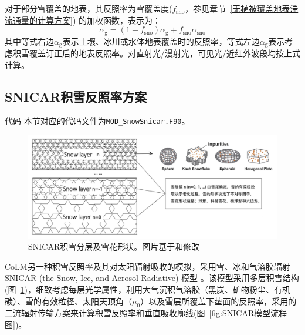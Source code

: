 对于部分雪覆盖的地表，其反照率为雪覆盖度($f_{\mathrm{sno}}$，参见章节~\ref{无植被覆盖地表湍流通量的计算方案}) 的加权函数，表示为：
\begin{equation}
  \alpha_{\mathrm{g}}=\left(1-f_{\mathrm{sno}}\right) \alpha_{\mathrm{g}} + f_{\mathrm{sno}} \alpha_{\mathrm{sno}}
\end{equation}
其中等式右边$\alpha_{\mathrm{g}}$表示土壤、冰川或水体地表覆盖时的反照率，等式左边$\alpha_{\mathrm{g}}$表示考虑积雪覆盖订正后的地表反照率。对直射光/漫射光，可见光/近红外波段均按上式计算。

\subsection{SNICAR积雪反照率方案}\label{SNICAR积雪反照率}
\begin{mymdframed}{代码}
  本节对应的代码文件为\texttt{MOD\_SnowSnicar.F90}。
\end{mymdframed}

{
  \begin{figure}[htbp]
    \centering
    \includegraphics[width=0.9\columnwidth]{Figures/辐射过程及辐射通量计算/SNICAR积雪分层及雪花形状.jpg}
    \caption[SNICAR积雪分层及雪花形状]{SNICAR积雪分层及雪花形状。图片基于\citet{he2017ImpactSnowGrain}和\citet{whicker2022SNICARADv4PhysicallyBased}修改}
    \label{fig:SNICAR积雪分层及雪花形状}
  \end{figure}
}

CoLM另一种积雪反照率及其对太阳辐射吸收的模拟，采用雪、冰和气溶胶辐射SNICAR (the Snow, Ice, and Aerosol Radiative) 模型 \citep{flanner2021SNICARADv3CommunityTool}。该模型采用多层积雪结构(图~\ref{fig:SNICAR积雪分层及雪花形状})，细致考虑每层光学属性，利用大气沉积气溶胶（黑炭、矿物粉尘、有机碳）、雪的有效粒径、太阳天顶角（\(\mu_{0}\)）以及雪层所覆盖下垫面的反照率，采用\citet{toon1989RapidCalculationRadiative}的二流辐射传输方案来计算积雪反照率和垂直吸收廓线(图~\ref{fig:SNICAR模型流程图})。

